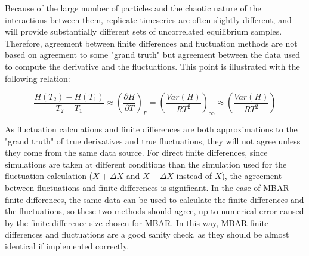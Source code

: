 \documentclass[aps,pre,twocolumn,nofootinbib,superscriptaddress,linenumbers,10pt, draft,tightenlines]{revtex4-1}
\begin{document}
Because of the large number of particles and the chaotic nature of the interactions between them, replicate timeseries are often slightly different, and will provide substantially different sets of uncorrelated equilibrium samples.  Therefore, agreement between finite differences and fluctuation methods are not based on agreement to some "grand truth" but agreement between the data used to compute the derivative and the fluctuations. This point is illustrated with the following relation:

\begin{equation}
\frac{H(T_2)-H(T_1)}{T_2-T_1} \approx \left(\frac{\partial H}{\partial T}\right)_P = \left(\frac{Var(H)}{RT^2}\right)_{\infty} \approx \left(\frac{Var(H)}{RT^2}\right)
\end{equation}

As fluctuation calculations and finite differences are both approximations to the "grand truth" of true derivatives and true fluctuations, they will not agree unless they come from the same data source.  For direct finite differences, since simulations are taken at different conditions than the simulation used for the fluctuation calculation ($X+\Delta X$ and $X-\Delta X$ instead of $X$), the agreement between fluctuations and finite differences is significant.  In the case of MBAR finite differences, the same data can be used to calculate the finite differences and the fluctuations, so these two methods should agree, up to numerical error caused by the finite difference size chosen for MBAR.  In this way, MBAR finite differences and fluctuations are a good sanity check, as they should be almost identical if implemented correctly.





 

\end{document}
